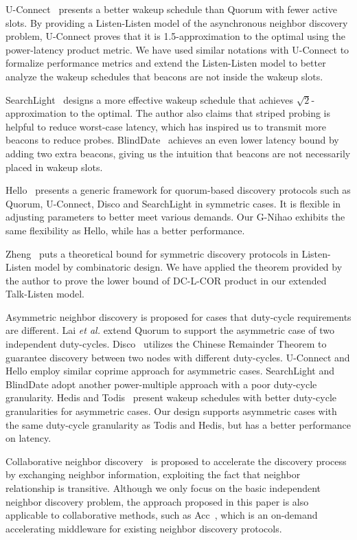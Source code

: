 \documentclass[conference]{IEEEtran}
\begin{document}
U-Connect~\cite{kandhalu2010u} presents a better wakeup schedule than Quorum with fewer active slots.
By providing a Listen-Listen model of the asynchronous neighbor discovery problem,
U-Connect proves that it is 1.5-approximation to the optimal using the power-latency product metric.
We have used similar notations with U-Connect to formalize performance metrics and
extend the Listen-Listen model to better analyze the wakeup schedules that beacons are not inside the wakeup slots.

SearchLight~\cite{bakht2012mobicom} designs a more effective wakeup schedule that achieves $\sqrt{2}$-approximation to the optimal.
The author also claims that striped probing is helpful to reduce worst-case latency, which has inspired us to transmit more beacons to reduce probes.
BlindDate~\cite{wang2015blinddate} achieves an even lower latency bound by adding two extra beacons, giving us the intuition that beacons are not necessarily placed in wakeup slots.

Hello~\cite{sun2014hello} presents a generic framework for quorum-based discovery protocols such as Quorum, U-Connect, Disco and SearchLight in symmetric cases.
It is flexible in adjusting parameters to better meet various demands. Our G-Nihao exhibits the same flexibility as Hello,
while has a better performance.

Zheng~\cite{zheng2003asynchronous} puts a theoretical bound for symmetric discovery protocols in Listen-Listen model by combinatoric design.
We have applied the theorem provided by the author to prove the lower bound of DC-L-COR product in our extended Talk-Listen model.

Asymmetric neighbor discovery is proposed for cases that duty-cycle requirements are different.
Lai \emph{et al.} extend Quorum to support the asymmetric case of two independent duty-cycles.
Disco~\cite{dutta2008practical} utilizes the Chinese Remainder Theorem to guarantee discovery between two nodes with different duty-cycles.
U-Connect and Hello employ similar coprime approach for asymmetric cases.
SearchLight and BlindDate adopt another power-multiple approach with a poor duty-cycle granularity.
Hedis and Todis~\cite{chen2015infocom} present wakeup schedules with better duty-cycle granularities for asymmetric cases.
Our design supports asymmetric cases with the same duty-cycle granularity as Todis and Hedis, but has a better performance on latency.

Collaborative neighbor discovery~\cite{zhang2012acc}\cite{cohen2011continuous}\cite{chen2012secon}\cite{purohit2011wiflock}
is proposed to accelerate the discovery process by exchanging neighbor information, exploiting the fact that neighbor relationship is transitive.
Although we only focus on the basic independent neighbor discovery problem, the approach proposed in this paper is also applicable to collaborative methods,
such as Acc~\cite{zhang2012acc}, which is an on-demand accelerating middleware for existing neighbor discovery protocols.
\end{document}
